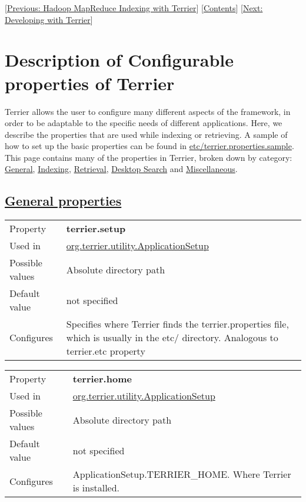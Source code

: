 {[}\href{hadoop_indexing.html}{Previous: Hadoop MapReduce Indexing with
Terrier}{]} {[}\href{index.html}{Contents}{]}
{[}\href{terrier_develop.html}{Next: Developing with Terrier}{]}\\

\section{Description of Configurable properties of
Terrier}\label{description-of-configurable-properties-of-terrier}

Terrier allows the user to configure many different aspects of the
framework, in order to be adaptable to the specific needs of different
applications. Here, we describe the properties that are used while
indexing or retrieving. A sample of how to set up the basic properties
can be found in
\href{../etc/terrier.properties.sample}{etc/terrier.properties.sample}.
This page contains many of the properties in Terrier, broken down by
category: \protect\hyperlink{general}{General},
\protect\hyperlink{indexing}{Indexing},
\protect\hyperlink{retrieval}{Retrieval},
\protect\hyperlink{desktop}{Desktop Search} and
\protect\hyperlink{misc}{Miscellaneous}.

\subsection{\texorpdfstring{\href{}{General
properties}}{General properties}}\label{general-properties}

\begin{longtable}[]{@{}ll@{}}
\toprule
Property & \textbf{terrier.setup}\tabularnewline
Used in &
\href{javadoc/org/terrier/utility/ApplicationSetup.html}{org.terrier.utility.ApplicationSetup}\tabularnewline
Possible values & Absolute directory path\tabularnewline
Default value & not specified\tabularnewline
Configures & Specifies where Terrier finds the terrier.properties file,
which is usually in the etc/ directory. Analogous to terrier.etc
property\tabularnewline
\bottomrule
\end{longtable}

\begin{longtable}[]{@{}ll@{}}
\toprule
Property & \textbf{terrier.home}\tabularnewline
Used in &
\href{javadoc/org/terrier/utility/ApplicationSetup.html}{org.terrier.utility.ApplicationSetup}\tabularnewline
Possible values & Absolute directory path\tabularnewline
Default value & not specified\tabularnewline
Configures & ApplicationSetup.TERRIER\_HOME. Where Terrier is
installed.\tabularnewline
\bottomrule
\end{longtable}

